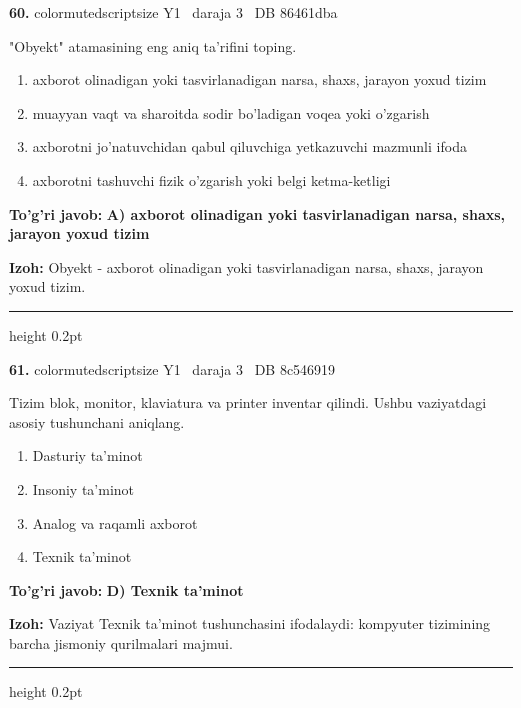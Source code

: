 \documentclass[10pt,a4paper,oneside]{article}
\begin{document}
\noindent\textbf{\color{ink}60.}  {color{muted}scriptsize Y1 \textbullet\ daraja 3 \textbullet\ DB 86461dba}
\par
"Obyekt" atamasining eng aniq ta'rifini toping.
\begin{enumerate}[label=\Alph*),leftmargin=9mm]
\item axborot olinadigan yoki tasvirlanadigan narsa, shaxs, jarayon yoxud tizim
\item muayyan vaqt va sharoitda sodir bo'ladigan voqea yoki o'zgarish
\item axborotni jo'natuvchidan qabul qiluvchiga yetkazuvchi mazmunli ifoda
\item axborotni tashuvchi fizik o'zgarish yoki belgi ketma-ketligi
\end{enumerate}
\begin{tcolorbox}[enhanced,breakable,colback=teal!4,colframe=teal!50!black,boxrule=0.5pt,arc=1.1mm,left=3mm,right=3mm,top=1.7mm,bottom=1.7mm,before skip=2mm,after skip=2mm]
\textbf{\color{teal}To'g'ri javob:} \textbf{A) axborot olinadigan yoki tasvirlanadigan narsa, shaxs, jarayon yoxud tizim}
\par\smallskip
\textbf{Izoh:} Obyekt - axborot olinadigan yoki tasvirlanadigan narsa, shaxs, jarayon yoxud tizim.
\end{tcolorbox}
\vspace{2mm}\hrule height 0.2pt \vspace{3mm}

\noindent\textbf{\color{ink}61.}  {color{muted}scriptsize Y1 \textbullet\ daraja 3 \textbullet\ DB 8c546919}
\par
Tizim blok, monitor, klaviatura va printer inventar qilindi. Ushbu vaziyatdagi asosiy tushunchani aniqlang.
\begin{enumerate}[label=\Alph*),leftmargin=9mm]
\item Dasturiy ta'minot
\item Insoniy ta'minot
\item Analog va raqamli axborot
\item Texnik ta'minot
\end{enumerate}
\begin{tcolorbox}[enhanced,breakable,colback=teal!4,colframe=teal!50!black,boxrule=0.5pt,arc=1.1mm,left=3mm,right=3mm,top=1.7mm,bottom=1.7mm,before skip=2mm,after skip=2mm]
\textbf{\color{teal}To'g'ri javob:} \textbf{D) Texnik ta'minot}
\par\smallskip
\textbf{Izoh:} Vaziyat Texnik ta'minot tushunchasini ifodalaydi: kompyuter tizimining barcha jismoniy qurilmalari majmui.
\end{tcolorbox}
\vspace{2mm}\hrule height 0.2pt \vspace{3mm}
\end{document}
